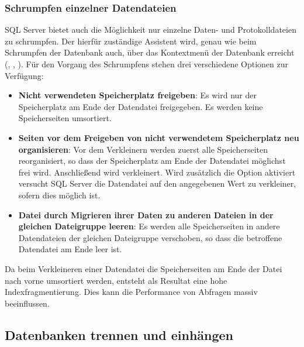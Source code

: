         \subsubsection{Schrumpfen einzelner Datendateien}
          SQL Server bietet auch die Möglichkeit nur einzelne Daten- und
          Protokolldateien zu schrumpfen. Der hierfür zuständige Assistent wird,
          genau wie beim Schrumpfen der Datenbank auch, über das Kontextmenü der Datenbank
          erreicht (, ,
          ).
          Für den Vorgang des Schrumpfens stehen drei verschiedene Optionen zur
          Verfügung:
          \begin{itemize}
              \item \textbf{Nicht verwendeten Speicherplatz freigeben}: Es wird
              nur der Speicherplatz am Ende der Datendatei freigegeben. Es
              werden keine Speicherseiten umsortiert.
              \item \textbf{Seiten vor dem Freigeben von nicht verwendetem
              Speicherplatz neu organisieren}: Vor dem Verkleinern werden zuerst
              alle Speicherseiten reorganisiert, so dass der Speicherplatz am
              Ende der Datendatei möglichst frei wird. Anschließend wird
              verkleinert. Wird zusätzlich die Option  aktiviert versucht SQL Server die Datendatei auf
              den angegebenen Wert zu verkleiner, sofern dies möglich ist.
              \item \textbf{Datei durch Migrieren ihrer Daten zu anderen Dateien
              in der gleichen Dateigruppe leeren}: Es werden alle Speicherseiten
              in andere Datendateien der gleichen Dateigruppe verschoben, so
              dass die betroffene Datendatei am Ende leer ist.
          \end{itemize}
          \begin{merke}
            Da beim Verkleineren einer Datendatei die Speicherseiten am Ende der
            Datei nach vorne umsortiert werden, entsteht als Resultat eine hohe
            Indexfragmentierung. Dies kann die Performance von Abfragen massiv
            beeinflussen.
          \end{merke}
      \subsection{Datenbanken trennen und einhängen}
      \label{movedatabases}
